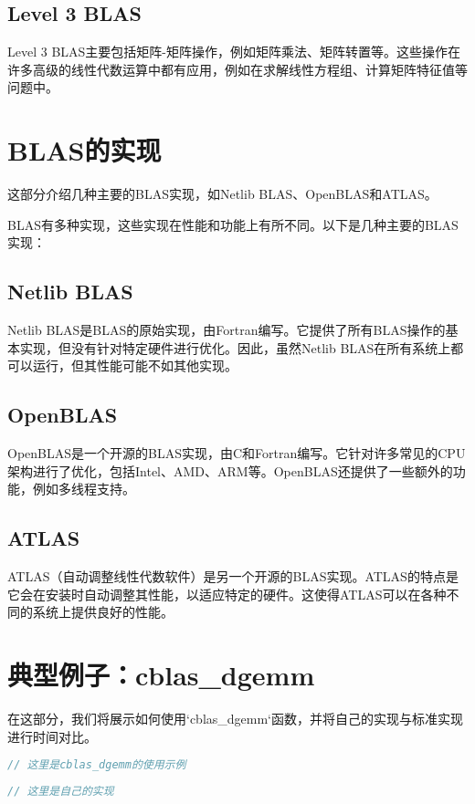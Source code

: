 \documentclass{ctexart}
\begin{document}
\subsection{Level 3 BLAS}
Level 3 BLAS主要包括矩阵-矩阵操作，例如矩阵乘法、矩阵转置等。这些操作在许多高级的线性代数运算中都有应用，例如在求解线性方程组、计算矩阵特征值等问题中。

\section{BLAS的实现}
这部分介绍几种主要的BLAS实现，如Netlib BLAS、OpenBLAS和ATLAS。

BLAS有多种实现，这些实现在性能和功能上有所不同。以下是几种主要的BLAS实现：

\subsection{Netlib BLAS}
Netlib BLAS是BLAS的原始实现，由Fortran编写。它提供了所有BLAS操作的基本实现，但没有针对特定硬件进行优化。因此，虽然Netlib BLAS在所有系统上都可以运行，但其性能可能不如其他实现。

\subsection{OpenBLAS}
OpenBLAS是一个开源的BLAS实现，由C和Fortran编写。它针对许多常见的CPU架构进行了优化，包括Intel、AMD、ARM等。OpenBLAS还提供了一些额外的功能，例如多线程支持。

\subsection{ATLAS}
ATLAS（自动调整线性代数软件）是另一个开源的BLAS实现。ATLAS的特点是它会在安装时自动调整其性能，以适应特定的硬件。这使得ATLAS可以在各种不同的系统上提供良好的性能。

\section{典型例子：cblas\_dgemm}
在这部分，我们将展示如何使用`cblas\_dgemm`函数，并将自己的实现与标准实现进行时间对比。

\begin{lstlisting}[language=C]
// 这里是cblas_dgemm的使用示例
\end{lstlisting}

\begin{lstlisting}[language=C]
// 这里是自己的实现
\end{lstlisting}
\end{document}
